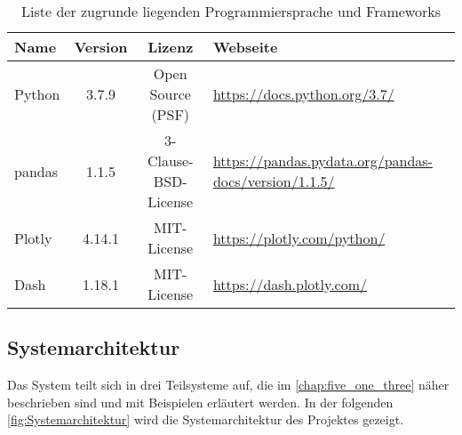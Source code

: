     \begingroup
        \setlength{\tabcolsep}{4pt} %
        \renewcommand{\arraystretch}{1.5}
        \begin{table}[H]
            \centering
            \begin{adjustbox}{max width=\textwidth}
            \Huge
            \begin{tabular}{lccl}
               \toprule
               \textbf{Name}             &{Version}    &\textbf{Lizenz}                        & \textbf{Webseite}\\
               \midrule     
                    Python               &3.7.9         &Open Source (PSF)                     & \url{https://docs.python.org/3.7/}\\
                    pandas               &1.1.5         &3-Clause-BSD-License                  & \url{https://pandas.pydata.org/pandas-docs/version/1.1.5/}\\
                    Plotly               &4.14.1       &MIT-License                           & \url{https://plotly.com/python/}\\
                    Dash                 &1.18.1        &MIT-License                           & \url{https://dash.plotly.com/}\\


                \bottomrule
            \end{tabular}
            \end{adjustbox}
            \caption{%
                Liste der zugrunde liegenden Programmiersprache und Frameworks
            \label{tab:Software-Requirements}
            }
             \end{table}
        \endgroup
    

    \subsection{Systemarchitektur}
    
    Das System teilt sich in drei Teilsysteme auf, die im \autoref{chap:five_one_three} näher beschrieben sind und mit Beispielen erläutert werden. 
    In der folgenden \autoref{fig:Systemarchitektur} wird die Systemarchitektur des Projektes gezeigt.

